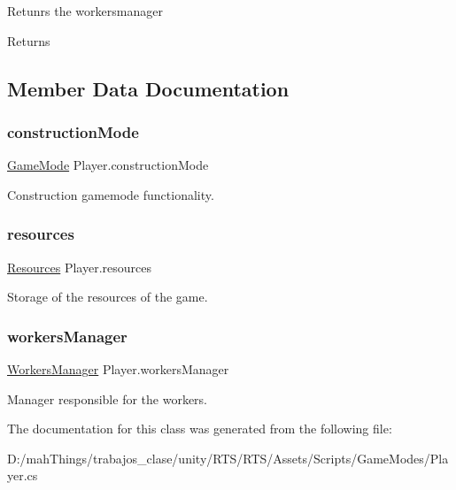 Retunrs the workersmanager 

\begin{DoxyReturn}{Returns}

\end{DoxyReturn}


\subsection{Member Data Documentation}
\mbox{\label{class_player_a9d353d318c614a9b9bb0062728d73583}} 
\subsubsection{\texorpdfstring{construction\+Mode}{constructionMode}}
{\footnotesize\ttfamily \mbox{\hyperlink{class_game_mode}{Game\+Mode}} Player.\+construction\+Mode\hspace{0.3cm}{\ttfamily [protected]}}



Construction gamemode functionality. 

\mbox{\label{class_player_a97bf2081445e8ee94ece51f2cd451c95}} 
\subsubsection{\texorpdfstring{resources}{resources}}
{\footnotesize\ttfamily \mbox{\hyperlink{class_resources}{Resources}} Player.\+resources}



Storage of the resources of the game. 

\mbox{\label{class_player_a54699f183e21ab9eee14dac9418c706b}} 
\subsubsection{\texorpdfstring{workers\+Manager}{workersManager}}
{\footnotesize\ttfamily \mbox{\hyperlink{class_workers_manager}{Workers\+Manager}} Player.\+workers\+Manager\hspace{0.3cm}{\ttfamily [protected]}}



Manager responsible for the workers. 



The documentation for this class was generated from the following file\+:\begin{DoxyCompactItemize}
\item 
D\+:/mah\+Things/trabajos\+\_\+clase/unity/\+R\+T\+S/\+R\+T\+S/\+Assets/\+Scripts/\+Game\+Modes/Player.\+cs\end{DoxyCompactItemize}
